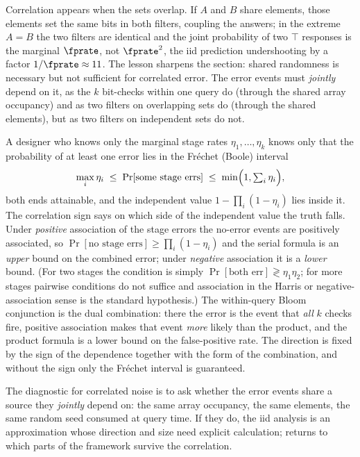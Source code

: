 Correlation appears when the sets overlap. If $A$ and $B$ share elements,
those elements set the same bits in both filters, coupling the answers;
in the extreme $A = B$ the two filters are identical and the joint
probability of two $\top$ responses is the marginal $\fprate$, not
$\fprate^2$, the iid prediction undershooting by a factor $1/\fprate
\approx 11$. The lesson sharpens the section: shared randomness is
necessary but not sufficient for correlated error. The error events must
\emph{jointly} depend on it, as the $k$ bit-checks within one query do
(through the shared array occupancy) and as two filters on overlapping
sets do (through the shared elements), but as two filters on independent
sets do not.

\begin{remark}
\label{rem:composition-correlation-bracket}
A designer who knows only the marginal stage rates $\eta_1, \ldots,
\eta_k$ knows only that the probability of at least one error lies in
the Fr\'echet (Boole) interval
\[
  \max_i \eta_i \;\le\; \Pr[\text{some stage errs}]
  \;\le\; \min\Bigl(1, \textstyle\sum_i \eta_i\Bigr),
\]
both ends attainable, and the independent value $1 - \prod_i (1 -
\eta_i)$ lies inside it. The correlation sign says on which side of the
independent value the truth falls. Under \emph{positive} association of
the stage errors the no-error events are positively associated, so
$\Pr[\text{no stage errs}] \ge \prod_i (1 - \eta_i)$ and the serial
formula is an \emph{upper} bound on the combined error; under
\emph{negative} association it is a \emph{lower} bound. (For two stages the
condition is simply $\Pr[\text{both err}] \gtrless \eta_1 \eta_2$; for
more stages pairwise conditions do not suffice and association in the
Harris or negative-association sense is the standard hypothesis.) The
within-query Bloom conjunction is the dual combination: there the error is
the event that \emph{all} $k$ checks fire, positive association makes that
event \emph{more} likely than the product, and the product formula is a
lower bound on the false-positive rate. The direction is fixed by the sign
of the dependence together with the form of the combination, and without
the sign only the Fr\'echet interval is guaranteed.
\end{remark}

The diagnostic for correlated noise is to ask whether the error events
share a source they \emph{jointly} depend on: the same array occupancy,
the same elements, the same random seed consumed at query time. If they
do, the iid analysis is an approximation whose direction and size need
explicit calculation;  returns to which
parts of the framework survive the correlation.

